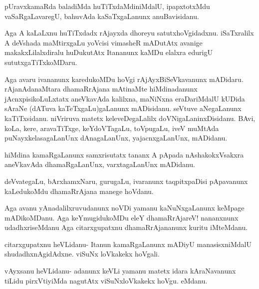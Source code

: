 \documentclass{article}
\begin{document}
\begin{mng}%
pUravxkamaRda baladiMda huTiTxdaMdiniMdalU, ipapxtotxMdu 
vaSaRgaLavaregU, bahuvAda kaSaTxgaLanunx anuBavisidanu.
\end{mng}

\begin{mng}%
Aga A kaLaLxnu huTiTxdadx rAjayxda dhoreyu satutxhoVgidadxnu. 
iSaTxralilx A deVshada maMtirxgaLu yoVcisi vimasheR mADutAtx avanige 
makakxLilalxdiralu huDukutAtx Itananunx kaMDu elalxra edurigU 
sututxgaTiTxkoMDaru.
\end{mng}

\begin{mng}%
Aga avaru ivananunx karedukoMDu hoVgi rAjAyxBiSeVkavanunx mADidaru. 
rAjanAdanaMtara dhamaRrAjana mAtinaMte hiMdinadanunx 
jAcnxpisikoLuLxtatx aneVkavAda kalilxna, maNiNxna eraDariMdalU kUDida 
sAraNe (dATuva kaTeTxgaLu)gaLanunx mADisidanu. seVtuve aNegaLanunx 
kaTiTxsidanu. niVriruva matetx keleveDegaLalilx doVNigaLaninxDisidanu. 
BAvi, koLa, kere, aravaTiTxge, keYdoVTagaLu, toVpugaLu, iveV muMtAda 
puNayxkelasagaLanUnx dAnagaLanUnx, yajacnxgaLanUnx, mADidanu.
\end{mng}

\begin{mng}%
hiMdina kamaRgaLanunx samxrisutatx tananx A pApada nAshakokxVsakxra 
aneVkavAda dhamaRgaLanUnx, varxtagaLanUnx mADidanu.
\end{mng}

\begin{mng}%
deVvategaLu, bArxhamxNaru, gurugaLu, ivaranunx taqpitxpaDisi 
pApavanunx kaLedukoMdu dhamaRrAjana manege hoVdanu.
\end{mng}

\begin{mng}%
Aga avanu yAnadalilxruvudanunx noVDi yamanu kaNuNxgaLanunx keMpage 
mADikoMDanu. Aga keYmugidukoMDu eleY dhamaRrAjareV! nananxnunx 
udadhxriseMdanu Aga citarxgupatxnu dhamaRrAjananunx kuritu iMteMdanu.
\end{mng}

\begin{mng}%
citarxgupatxnu heVLidanu- Itanun kamaRgaLanunx mADiyU manasisxniMdalU 
shudadhxnAgidAdxne. viSuNx loVkakekx hoVgali.
\end{mng}

\begin{mng}%
vAyxsanu heVLidanu- adanunx keVLi yamanu matetx idara kAraNavanunx 
tiLidu pirxVtiyiMda nagutAtx viSuNxloVkakekx hoVgu. eMdanu.
\end{mng}
\end{document}
